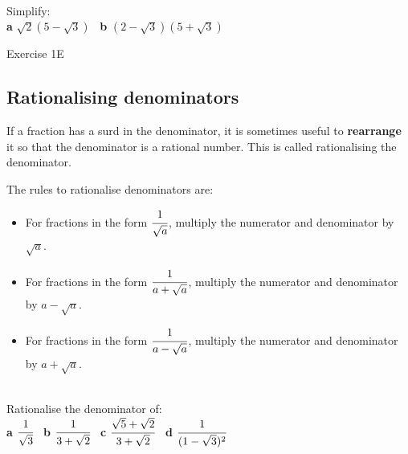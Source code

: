 \documentclass[fleqn, twoside]{article}
\begin{document}
\vspace{5cm}
\begin{examplebox}{}{}
    \\ %
    Simplify: \\
    \textbf{a}\hspace{2mm} $\sqrt{2}(5-\sqrt{3})$        \hspace{20mm} \
    \textbf{b}\hspace{2mm} $(2-\sqrt{3})(5+\sqrt{3})$    \hspace{20mm}
\end{examplebox}

\vfill
\begin{practice*}{Exercise 1E}{}
\end{practice*}
\newpage




\subsection{Rationalising denominators}
\begin{mybox2}[colbacktitle=green]{}
    If a fraction has a surd in the denominator, it is sometimes useful to \textbf{rearrange} it so that the denominator is a rational number. This is called rationalising the denominator.
    \vspace{2mm}

    \textbullet\space The rules to rationalise denominators are:\vspace{-2mm}
    \begin{itemize}
        \setlength{\itemsep}{-3pt}%
        \item For fractions in the form $\cfrac{1}{\sqrt{a}}$, multiply the numerator and denominator by $\sqrt{a}$.
        \item For fractions in the form $\cfrac{1}{a+\sqrt{a}}$, multiply the numerator and denominator by $a-\sqrt{a}$.
        \item For fractions in the form $\cfrac{1}{a-\sqrt{a}}$, multiply the numerator and denominator by $a+\sqrt{a}$.
    \end{itemize}

\end{mybox2}
\begin{examplebox}{}{}
    \\ %
    Rationalise the denominator of: \\
    \textbf{a}\hspace{2mm} $\cfrac{1}{\sqrt{3}}$                      \hspace{20mm} \
    \textbf{b}\hspace{2mm} $\cfrac{1}{3+\sqrt{2}}$                    \hspace{20mm} \
    \textbf{c}\hspace{2mm} $\cfrac{\sqrt{5}+\sqrt{2}}{3+\sqrt{2}}$    \hspace{20mm} \
    \textbf{d}\hspace{2mm} $\cfrac{1}{(1-\sqrt{3})^2}$                \hspace{20mm} \
\end{examplebox}
\end{document}

